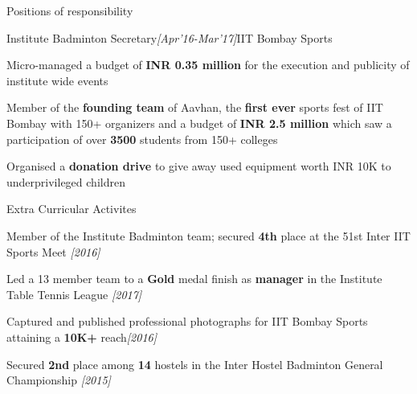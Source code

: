\documentclass[a4paper,10pt]{resume}%
\begin{document}
\begin{rSection}{{Positions of responsibility}}
\begin{rSubsection}{{Institute Badminton Secretary}}{\sl \small [Apr'16-Mar'17]}{IIT Bombay Sports}
\vspace{-1.0mm}
\item Micro-managed a budget of \textbf{INR 0.35 million} for the execution and publicity of institute wide events
\item Member of the \textbf{founding team} of Aavhan, the \textbf{first ever} sports fest of IIT Bombay with 150+ organizers and a budget of \textbf{INR 2.5 million} which saw a participation of over \textbf{3500} students from 150+ colleges 
\item Organised a \textbf{donation drive} to give away used equipment worth INR 10K to underprivileged children
\end{rSubsection}

\end{rSection}
\vspace{-2mm}

\begin{rSection}{{Extra Curricular Activites}}
\begin{eSubsection}{}{}{}{}
\vspace{-4mm}
\item Member of the Institute Badminton team; secured \textbf{4th} place at the 51st Inter IIT Sports Meet \hfill{\sl \small [2016]}
\item Led a 13 member team to a \textbf{Gold} medal finish as \textbf{manager}  in the Institute Table Tennis League \hfill{\sl \small [2017]}
\item Captured and published professional photographs for IIT Bombay Sports attaining a \textbf{10K+} reach\hfill{\sl \small [2016]}
\item Secured \textbf{2nd} place among \textbf{14} hostels in the Inter Hostel Badminton General Championship \hfill{\sl \small [2015]}
\end{eSubsection}
\end{rSection}
\end{document}
